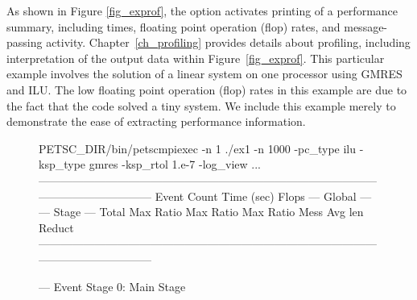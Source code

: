 As shown in Figure \ref{fig_exprof}, the option  activates printing of a performance summary, including
times, floating point operation (flop) rates, and message-passing
activity.  Chapter~\ref{ch_profiling}
provides details about profiling, including interpretation of the
output data within Figure~\ref{fig_exprof}.  This particular example involves the solution of a linear
system on one processor using GMRES and ILU.  The low floating point
operation (flop) rates in this example are due to the fact that the
code solved a tiny system.  We include this example merely to
demonstrate the ease of extracting performance information.

\begin{figure}[H]
{
  \begin{outputlisting}[\fontsize{7.5pt}{8pt}\ttfamily]
$ $PETSC_DIR/bin/petscmpiexec -n 1 ./ex1 -n 1000 -pc_type ilu -ksp_type gmres -ksp_rtol 1.e-7 -log_view
...
------------------------------------------------------------------------------------------------------------------------
Event                Count      Time (sec)     Flops                             --- Global ---  --- Stage ---   Total
                   Max Ratio  Max     Ratio   Max  Ratio  Mess   Avg len Reduct  %
------------------------------------------------------------------------------------------------------------------------

--- Event Stage 0: Main Stage


\end{outputlisting}}
\end{figure}
